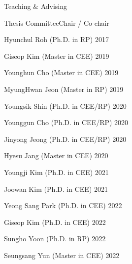 \begin{rSection}{Teaching \& Advising}
\begin{rSubsection}{Thesis Committee}{}{Chair / Co-chair }{}
  \item Hyunchul Roh (Ph.D. in \ac{RP}) \hfill 2017
  \item Giseop Kim (Master in \ac{CEE}) \hfill 2019
  \item Younghun Cho (Master in \ac{CEE}) \hfill 2019
  \item MyungHwan Jeon (Master in \ac{RP}) \hfill 2019
  \item Youngsik Shin (Ph.D. in \ac{CEE}/\ac{RP}) \hfill 2020
  \item Younggun Cho (Ph.D. in \ac{CEE}/\ac{RP}) \hfill 2020
  \item Jinyong Jeong (Ph.D. in \ac{CEE}/\ac{RP}) \hfill 2020
  \item Hyesu Jang (Master in \ac{CEE}) \hfill 2020
  \item Youngji Kim (Ph.D. in \ac{CEE}) \hfill 2021
  \item Joowan Kim (Ph.D. in \ac{CEE}) \hfill 2021
  \item Yeong Sang Park (Ph.D. in \ac{CEE}) \hfill 2022
  \item Giseop Kim (Ph.D. in \ac{CEE}) \hfill 2022
  \item Sungho Yoon (Ph.D. in \ac{RP}) \hfill 2022
  \item Seungsang Yun (Master in \ac{CEE}) \hfill 2022
\end{rSubsection}

\end{rSection}
